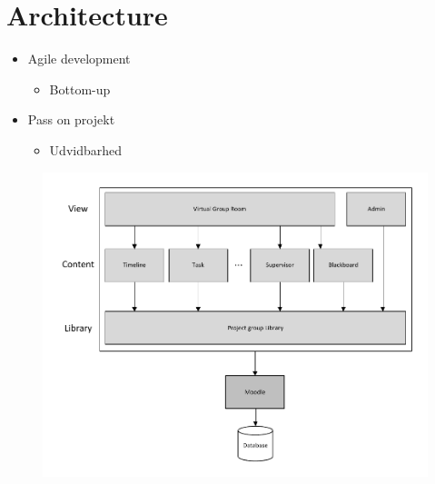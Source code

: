 \section{Architecture}
\begin{frame}
\begin{itemize}
	\item Agile development
	\begin{itemize}
		\item Bottom-up  
	\end{itemize}
	\item Pass on projekt
	\begin{itemize}
		\item Udvidbarhed
	\end{itemize}
	
\end{itemize}
\end{frame}


\begin{frame}
\begin{figure}%
\includegraphics[width=\columnwidth]{input/Assets/architecture}%
\caption{}%
\label{}%
\end{figure}	
\end{frame}